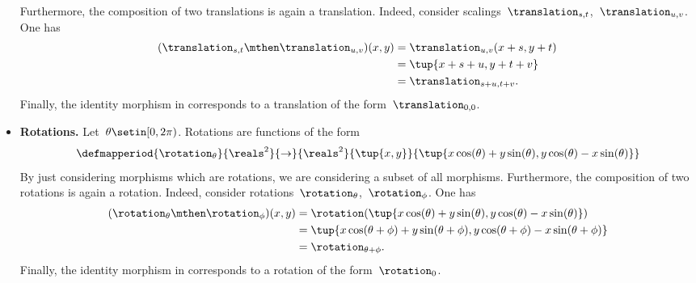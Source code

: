 \begin{solution}
\begin{itemize}
              Furthermore, the composition of two translations is again a translation.
              Indeed, consider scalings~$\translation_{s,t}$,~$\translation_{u,v}$.
              One has
              \begin{equation*}
                  \begin{aligned}
                      (\translation_{s,t}\mthen \translation_{u,v})(x,y) & =\translation_{u,v}(x+s, y+t) \\
                                                                         & =\tup{x+s+u, y+t+v} \\
                                                                         & =\translation_{s+u,t+v}.
                  \end{aligned}
              \end{equation*}
              Finally, the identity morphism in \Draw corresponds to a translation of the form~$\translation_{0,0}$.
        \item \textbf{Rotations.}
              Let~$\theta \setin [0,2\pi)$.
              Rotations are functions of the form
              \begin{equation*}
                  \defmapperiod{\rotation_{\theta}}{\reals^2}{\to}{\reals^2}{\tup{x,y}}{\tup{x\cos(\theta)+y\sin(\theta), y\cos(\theta)-x\sin(\theta)}}
              \end{equation*}
              By just considering morphisms which are rotations, we are considering a subset of all morphisms.
              Furthermore, the composition of two rotations is again a rotation.
              Indeed, consider rotations~$\rotation_{\theta}$,~$\rotation_{\phi}$.
              One has
              \begin{equation*}
                  \begin{aligned}
                      (\rotation_{\theta}\mthen \rotation_{\phi})(x,y) & =\rotation(\tup{x\cos(\theta)+y\sin(\theta), y\cos(\theta)-x\sin(\theta)}) \\
                                                                       & =\tup{x\cos(\theta+\phi)+y\sin(\theta+\phi), y\cos(\theta+\phi)-x\sin(\theta+\phi)} \\
                                                                       & =\rotation_{\theta+\phi}.
                  \end{aligned}
              \end{equation*}
              Finally, the identity morphism in \Draw corresponds to a rotation of the form~$\rotation_{0}$.

\end{itemize}
\end{solution}
